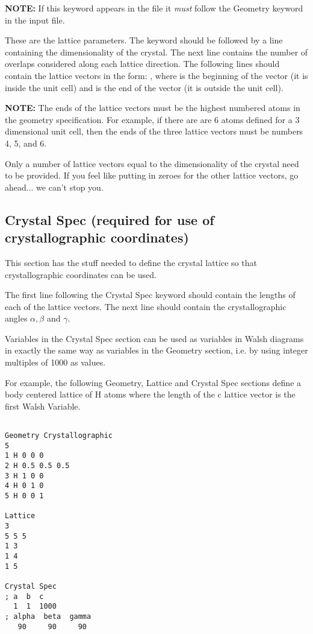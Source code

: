 {\bf NOTE:} If this keyword appears in the file it {\em must} follow
the {\sf Geometry} keyword in the input file.

These are the lattice parameters.
The keyword should be followed by a line containing the dimensionality
of the crystal.  The next line contains the number of overlaps
considered along each lattice direction. The following lines should
contain the lattice vectors in the form:   ,
where  is the beginning of the vector (it is inside the
unit cell) and  is the end of the vector (it is outside
the unit cell).

{\bf NOTE:}  The ends of the lattice vectors must be the highest
numbered atoms in the geometry specification. For example, if there are
are 6 atoms defined for a 3 dimensional unit cell, then the ends of
the three lattice vectors must be numbers 4, 5, and 6.

Only a number of lattice vectors equal to the dimensionality of the
crystal need to be provided.  If you feel like putting in zeroes for
the other lattice vectors, go ahead... we can't stop you.



\subsection{{\sf Crystal Spec} (required for use of crystallographic
coordinates)} 

This section has the stuff needed to define the crystal lattice so
that crystallographic coordinates can be used.

The first line following the {\sf Crystal Spec} keyword should contain
the lengths of each of the lattice vectors.  The next line should
contain the crystallographic angles $\alpha, \beta$ and $\gamma$.

Variables in the {\sf Crystal Spec} section can be used as variables
in Walsh diagrams in exactly the same way as variables in the {\sf
Geometry} section, i.e. by using integer multiples of 1000 as values.

For example, the following {\sf Geometry}, {\sf Lattice} and {\sf
Crystal Spec} 
sections define a body centered lattice of H atoms where the length of
the c lattice vector is the first Walsh Variable.

\clearpage

\shrinkspacing
\begin{verbatim}

Geometry Crystallographic
5
1 H 0 0 0
2 H 0.5 0.5 0.5
3 H 1 0 0
4 H 0 1 0
5 H 0 0 1

Lattice
3
5 5 5 
1 3
1 4
1 5

Crystal Spec
; a  b  c
  1  1  1000
; alpha  beta  gamma
   90     90     90

\end{verbatim}
\resumespacing


